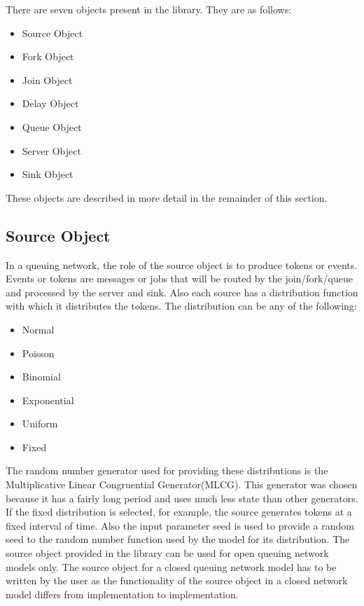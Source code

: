 \documentclass[11pt]{report}
\begin{document}
There are seven objects present in the library.  They are as follows: 

\begin{itemize}
\item Source Object
\item Fork Object 
\item Join Object 
\item Delay Object 
\item Queue Object 
\item Server Object 
\item Sink Object 
\end{itemize}
These objects are described in more detail in the remainder of this
section. 

\subsection{Source Object}

In a queuing network, the role of the source object is to produce tokens
or events.  Events or tokens are messages or jobs that will be routed by
the join/fork/queue and processed by the server and sink.  Also each
source has a distribution function with which it distributes the
tokens.  The distribution can be any of the following:

\begin{itemize}
\item Normal 
\item Poisson 
\item Binomial 
\item Exponential 
\item Uniform 
\item Fixed
\end{itemize}

The random number generator used for providing these distributions is
the Multiplicative Linear Congruential Generator(MLCG).  This generator
was chosen because it has a fairly long period and uses much less state
than other generators.  If the fixed distribution is selected, for
example, the source generates tokens at a fixed interval of time.  Also
the input parameter seed is used to provide a random seed to the random
number function used by the model for its distribution.  The source
object provided in the library can be used for open queuing network
models only.  The source object for a closed queuing network model has
to be written by the user as the functionality of the source object in a
closed network model differs from implementation to implementation.
\end{document}
